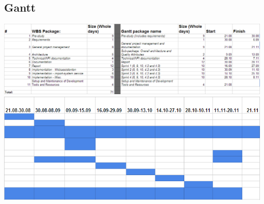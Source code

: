 \subsection{Gantt}
\hspace{-1.7cm}\includegraphics[width=1.3\textwidth]{images/gantt01.png}\\

\includegraphics[width=1\textwidth]{images/gantt02.png}
